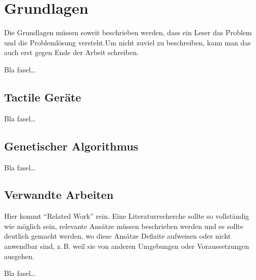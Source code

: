 
\chapter{Grundlagen}
\label{ch:Grundlagen}
Die Grundlagen müssen soweit beschrieben
werden, dass ein Leser das Problem und
die Problemlösung  versteht.Um nicht zuviel 
zu beschreiben, kann man das auch erst gegen 
Ende der Arbeit schreiben.

Bla fasel\ldots

\section{Tactile Geräte}
\label{ch:Grundlagen:sec:Taktile Geräte}

Bla fasel\ldots




\section{Genetischer Algorithmus}
\label{ch:Grundlagen:sec:Genetischer Algorithmus}

Bla fasel\ldots


\section{Verwandte Arbeiten}
\label{ch:Grundlagen:sec:RelatedWork}
Hier kommt "`Related Work"' rein.
Eine Literaturrecherche sollte so vollständig wie möglich sein,
relevante Ansätze müssen beschrieben werden und es sollte deutlich 
gemacht werden, wo diese Ansätze Defizite aufweisen oder nicht
anwendbar sind, z.\,B. weil sie von anderen Umgebungen oder 
Voraussetzungen ausgehen.

Bla fasel\ldots





